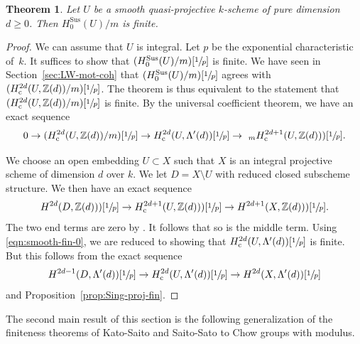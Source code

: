 \documentclass[11pt]{article}
\numberwithin{equation}{section}
\let\ra\rightarrow
\newcommand{\rc}{\mathrm{c}}
\newcommand{\sus}{\mathrm{Sus}}
\newtheorem{thm}{Theorem}[section]
\theoremstyle{definition}
\newcommand{\propref}{Proposition~\ref}
\newcommand{\secref}{Section~\ref}
\newcommand{\Z}{{\mathbb Z}}
\begin{document}
\begin{thm}\label{thm:smooth-fin}
Let $U$ be a smooth quasi-projective $k$-scheme of pure dimension $d \ge 0$.
Then ${H^{\sus}_0(U)}/m$ is finite.
\end{thm}
\begin{proof}
We can assume that $U$ is integral.
Let $p$ be the exponential characteristic of~$k$.
It suffices to show that $({H^{\sus}_0(U)}/m)[\sfrac{1}{p}]$ is finite.
We have seen in \secref{sec:LW-mot-coh} that
$({H^{\sus}_0(U)}/m)[\sfrac{1}{p}]$ agrees with
$({H^{2d}_\rc(U, \Z(d))}/m)[\sfrac{1}{p}]$.
The theorem is thus equivalent to the statement that
$({H^{2d}_\rc(U, \Z(d))}/m)[\sfrac{1}{p}]$ is finite.
By the universal coefficient theorem, we have an exact sequence
\begin{equation}\label{eqn:smooth-fin-0}
0 \ra ({H^{2d}_\rc(U, \Z(d))}/m)[\sfrac{1}{p}]
\ra H^{2d}_\rc(U, \Lambda'(d))[\sfrac{1}{p}] \ra~_mH^{2d+1}_\rc(U, \Z(d)))[\sfrac{1}{p}].
\end{equation}

We choose an open embedding $U \subset X$ such that $X$ is an integral
projective scheme of dimension $d$ over $k$. We let $D = X \setminus U$
with reduced closed subscheme structure.
We then have an exact sequence
\[
H^{2d}(D, \Z(d)))[\sfrac{1}{p}] \to H^{2d+1}_\rc(U, \Z(d)))[\sfrac{1}{p}] \to
H^{2d+1}(X, \Z(d)))[\sfrac{1}{p}].
\]
The two end terms are zero by \cite[Th.\,5.1]{KP}. It follows that so is the
middle term. Using \eqref{eqn:smooth-fin-0},
we are reduced to showing that
$H^{2d}_\rc(U, \Lambda'(d))[\sfrac{1}{p}]$ is finite.
But this follows from the exact sequence
\[
H^{2d-1}(D, \Lambda'(d))[\sfrac{1}{p}] \to
H^{2d}_\rc(U, \Lambda'(d))[\sfrac{1}{p}] \to H^{2d}(X, \Lambda'(d))[\sfrac{1}{p}]
\]
and \propref{prop:Sing-proj-fin}.
\end{proof}

The second main result of this section is the following generalization of the
finiteness theorems of Kato-Saito \cite{Kato-Saito-1} and Saito-Sato
\cite{SaitoSatoAnnals} to Chow groups with modulus.
\end{document}

